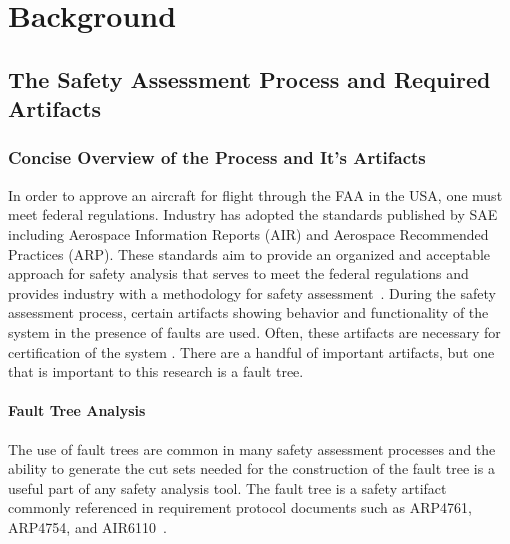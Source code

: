 \chapter{Background}
\label{chap:background}

\section{The Safety Assessment Process and Required Artifacts}
\subsection{Concise Overview of the Process and It's Artifacts}
In order to approve an aircraft for flight through the FAA in the USA, one must meet federal regulations. Industry has adopted the standards published by SAE including Aerospace Information Reports (AIR) and Aerospace Recommended Practices (ARP). These standards aim to provide an organized and acceptable approach for safety analysis that serves to meet the federal regulations and provides industry with a methodology for safety assessment~\cite{FAA,SAE}. During the safety assessment process, certain artifacts showing behavior and functionality of the system in the presence of faults are used. Often, these artifacts are necessary for certification of the system . There are a handful of important artifacts, but one that is important to this research is a fault tree.

\subsubsection{Fault Tree Analysis}
The use of fault trees are common in many safety assessment processes and the ability to generate the cut sets needed for the construction of the fault tree is a useful part of any safety analysis tool. The fault tree is a safety artifact commonly referenced in requirement protocol documents such as ARP4761, ARP4754, and AIR6110~\cite{SAE:ARP4761,SAE:ARP4754A,AIR6110}.

